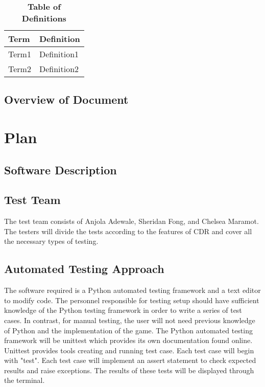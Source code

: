 \documentclass[12pt, titlepage]{article}
\begin{document}
\begin{table}[!htbp]
\caption{\textbf{Table of Definitions}} \label{Table}

\begin{tabularx}{\textwidth}{p{3cm}X}
\toprule
\textbf{Term} & \textbf{Definition}\\
\midrule
Term1 & Definition1\\
Term2 & Definition2\\
\bottomrule
\end{tabularx}

\end{table}	

\subsection{Overview of Document}

\section{Plan}
	
\subsection{Software Description}

\subsection{Test Team}

The test team consists of Anjola Adewale, Sheridan Fong, and Chelsea Maramot. The testers will divide the tests according to the features of CDR and cover all the necessary types of testing.

\subsection{Automated Testing Approach}

The software required is a Python automated testing framework and a text editor to modify code. The personnel responsible for testing setup should have sufficient knowledge of the Python testing framework in order to write a series of test cases. In contrast, for manual testing, the user will not need previous knowledge of Python and the implementation of the game. The Python automated testing framework will be unittest which provides its own documentation found online. Unittest provides tools creating and running test case. Each test case will begin with "test". Each test case will implement an assert statement to check expected results and raise exceptions. The results of these tests will be displayed through the terminal.
\end{document}
